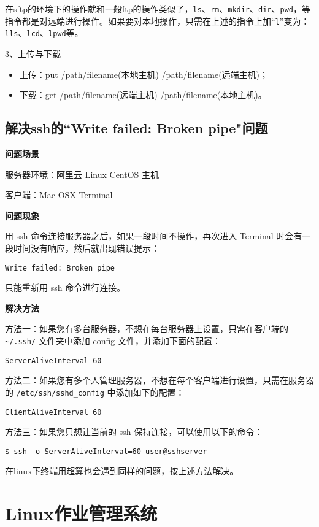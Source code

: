 {在sftp的环境下的操作就和一般ftp的操作类似了，\verb|ls|、\verb|rm|、\verb|mkdir|、\verb|dir|、\verb|pwd|，等指令都是对远端进行操作。如果要对本地操作，只需在上述的指令上加“\verb|l|”变为：\verb|lls|、\verb|lcd|、\verb|lpwd|等。

3、上传与下载

\begin{itemize}
\item 上传：put /path/filename(本地主机) /path/filename(远端主机)；
\item 下载：get /path/filename(远端主机) /path/filename(本地主机)。
\end{itemize}



\subsection{解决ssh的``Write failed: Broken pipe"问题}

\textbf{问题场景}

服务器环境：阿里云 Linux CentOS 主机

客户端：Mac OSX Terminal

\textbf{问题现象}

用 ssh 命令连接服务器之后，如果一段时间不操作，再次进入 Terminal 时会有一段时间没有响应，然后就出现错误提示：

\verb|Write failed: Broken pipe|

只能重新用 ssh 命令进行连接。

\textbf{解决方法}

方法一：如果您有多台服务器，不想在每台服务器上设置，只需在客户端的 \verb*|~/.ssh/| 文件夹中添加 config 文件，并添加下面的配置：

\verb*|ServerAliveInterval 60|

方法二：如果您有多个人管理服务器，不想在每个客户端进行设置，只需在服务器的 \verb*|/etc/ssh/sshd_config| 中添加如下的配置：

\verb*|ClientAliveInterval 60|

方法三：如果您只想让当前的 ssh 保持连接，可以使用以下的命令：

\verb*|$ ssh -o ServerAliveInterval=60 user@sshserver|


在linux下终端用超算也会遇到同样的问题，按上述方法解决。



\section{Linux作业管理系统}
}
